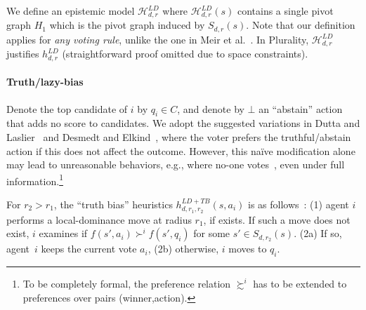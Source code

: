 \documentclass[letterpaper]{article} %
\def\calH{\mathcal{H}}
\begin{document}
We define an epistemic model $\calH^{LD}_{d,r}$ where $\calH^{LD}_{d,r}(s)$ contains a single pivot graph $H_1$ which is the pivot graph induced by $S_{d,r}(s)$. Note that our definition applies for \emph{any voting rule}, unlike the one in Meir et al.~. In Plurality, $\calH^{LD}_{d,r}$ justifies $h^{LD}_{d,r}$ (straightforward proof omitted due to space constraints).



\paragraph{Truth/lazy-bias}
Denote the top candidate of $i$ by $q_i\in C$, and denote by $\bot$ an ``abstain'' action that adds no score to candidates.
We adopt the suggested variations in Dutta and Laslier~ and Desmedt and Elkind~, where the voter prefers the truthful/abstain action if this does not affect the outcome. However, this na\"ive modification alone may lead to unreasonable behaviors, e.g., where no-one votes~\cite{elkind2015equilibria}, even under full information.\footnote{To be completely formal, the preference relation $\succsim^i$ has to be extended to preferences over pairs (winner,action).}

For $r_2>r_1$, the ``truth bias'' heuristics $h^{LD+TB}_{d,r_1,r_2}(s,a_i)$ is as follows~\cite{MLR14}: (1) agent $i$ performs a local-dominance move at radius $r_{1}$, if exists. If such a move does not exist, $i$ examines if $f(s',a_i) \succ^i f(s',q_i)$ for some $s'\in S_{d,r_2}(s)$. (2a) If so, agent~$i$ keeps the current vote $a_i$, (2b) otherwise, $i$ moves to $q_i$.
\end{document}
